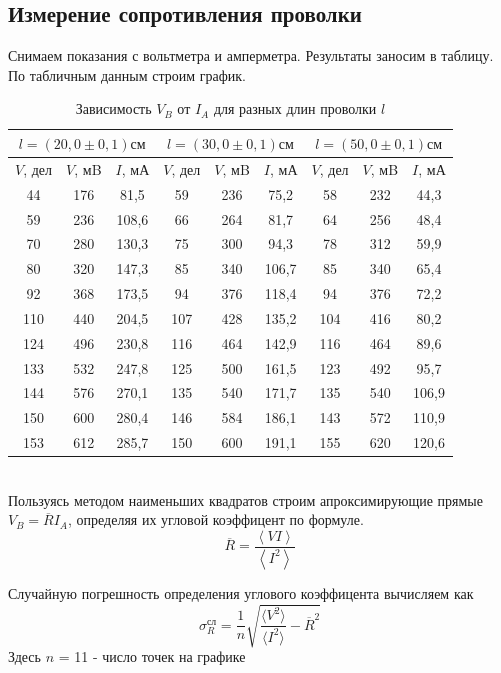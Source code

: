 \documentclass[a4paper,12pt]{article} %
\begin{document}
\subsection{Измерение сопротивления проволки}
Снимаем показания с вольтметра и амперметра. Результаты заносим в таблицу. По табличным данным строим график.
\begin{table}[h]
\caption{Зависимость $V_B$ от $I_A$ для разных длин проволки $l$}
\centering
\begin{tabular}{|c|c|c|c|c|c|c|c|c|}
\hline
\multicolumn{3}{|c|}{$l = (20,0\pm0,1)\text{см}$} & \multicolumn{3}{|c|}{$l = (30,0\pm0,1)\text{см}$} & \multicolumn{3}{|c|}{$l = (50,0\pm0,1)\text{см}$}\\ \hline
$V$, дел & $V$, мB & $I$, мА & $V$, дел & $V$, мB & $I$, мА & $V$, дел & $V$, мB &$I$, мА \\ \hline
44   & 176 & 81,5    & 59 & 236 & 75,2& 58&232&44,3\\ \hline
59   & 236 & 108,6 & 66 & 264 & 81,7&64&256&48,4\\ \hline
70   & 280 & 130,3 & 75 & 300 & 94,3&78&312& 59,9\\ \hline
80   & 320 & 147,3 & 85 & 340 & 106,7& 85& 340& 65,4\\ \hline
92   & 368 & 173,5 & 94 & 376 & 118,4& 94& 376&72,2\\ \hline
110  & 440 & 204,5 & 107& 428& 135,2&104&416&80,2\\ \hline
124 & 496 & 230,8 & 116 & 464 & 142,9& 116& 464& 89,6\\ \hline
133 & 532 & 247,8 & 125& 500 & 161,5 &123 &492& 95,7\\ \hline
144 & 576 & 270,1 & 135& 540 & 171,7 & 135 & 540 & 106,9\\ \hline
150 & 600 & 280,4 & 146& 584 & 186,1 &143 &572 &110,9\\ \hline
153 & 612 & 285,7 & 150& 600 & 191,1 & 155 & 620 & 120,6\\ \hline
\end{tabular}
\end{table}\\

Пользуясь методом наименьших квадратов строим апроксимирующие прямые $V_B=\overline{R}I_A$, определяя их угловой коэффицент по формуле.
\[\overline{R} = \frac{\left\langle VI \right\rangle}{\left\langle I^2\right\rangle}\]

Случайную погрешность определения углового коэффицента вычисляем как
\[\sigma_R^\text{сл} = \frac{1}{n}\sqrt{\frac{\langle{V^2}\rangle}{\langle{I^2}\rangle}-\overline{R}^2}\]
Здесь $n$ = 11 - число точек на графике
\end{document}
